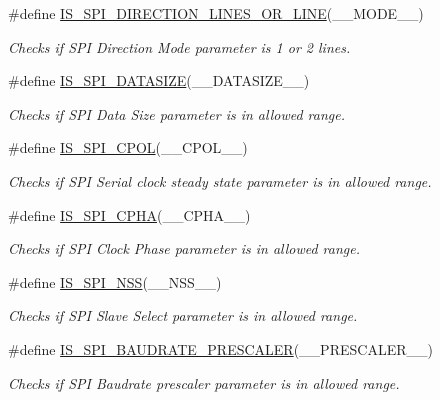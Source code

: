 \begin{DoxyCompactItemize}
\#define \hyperlink{group___s_p_i___private___macros_ga525d9decc1251ec9037bd3c66c0e3a8c}{I\+S\+\_\+\+S\+P\+I\+\_\+\+D\+I\+R\+E\+C\+T\+I\+O\+N\+\_\+L\+I\+N\+E\+S\+\_\+\+O\+R\+\_\+L\+I\+NE}(\+\_\+\+\_\+\+M\+O\+D\+E\+\_\+\+\_\+)
\begin{DoxyCompactList}\small\item\em Checks if S\+PI Direction Mode parameter is 1 or 2 lines. \end{DoxyCompactList}\item 
\#define \hyperlink{group___s_p_i___private___macros_gac04b1218a162772dca3854aa3a441856}{I\+S\+\_\+\+S\+P\+I\+\_\+\+D\+A\+T\+A\+S\+I\+ZE}(\+\_\+\+\_\+\+D\+A\+T\+A\+S\+I\+Z\+E\+\_\+\+\_\+)
\begin{DoxyCompactList}\small\item\em Checks if S\+PI Data Size parameter is in allowed range. \end{DoxyCompactList}\item 
\#define \hyperlink{group___s_p_i___private___macros_gad60cb1a9c1e1f89e8e9740a0ca734443}{I\+S\+\_\+\+S\+P\+I\+\_\+\+C\+P\+OL}(\+\_\+\+\_\+\+C\+P\+O\+L\+\_\+\+\_\+)
\begin{DoxyCompactList}\small\item\em Checks if S\+PI Serial clock steady state parameter is in allowed range. \end{DoxyCompactList}\item 
\#define \hyperlink{group___s_p_i___private___macros_gaf5ed92fbe83dada8ebcce64c04ef0f72}{I\+S\+\_\+\+S\+P\+I\+\_\+\+C\+P\+HA}(\+\_\+\+\_\+\+C\+P\+H\+A\+\_\+\+\_\+)
\begin{DoxyCompactList}\small\item\em Checks if S\+PI Clock Phase parameter is in allowed range. \end{DoxyCompactList}\item 
\#define \hyperlink{group___s_p_i___private___macros_ga7e90530e595a47ab465e3e222014f5e3}{I\+S\+\_\+\+S\+P\+I\+\_\+\+N\+SS}(\+\_\+\+\_\+\+N\+S\+S\+\_\+\+\_\+)
\begin{DoxyCompactList}\small\item\em Checks if S\+PI Slave Select parameter is in allowed range. \end{DoxyCompactList}\item 
\#define \hyperlink{group___s_p_i___private___macros_gad15d5bdc7ac1698d1956a25b200e1f25}{I\+S\+\_\+\+S\+P\+I\+\_\+\+B\+A\+U\+D\+R\+A\+T\+E\+\_\+\+P\+R\+E\+S\+C\+A\+L\+ER}(\+\_\+\+\_\+\+P\+R\+E\+S\+C\+A\+L\+E\+R\+\_\+\+\_\+)
\begin{DoxyCompactList}\small\item\em Checks if S\+PI Baudrate prescaler parameter is in allowed range. \end{DoxyCompactList}\item 

\end{DoxyCompactItemize}

